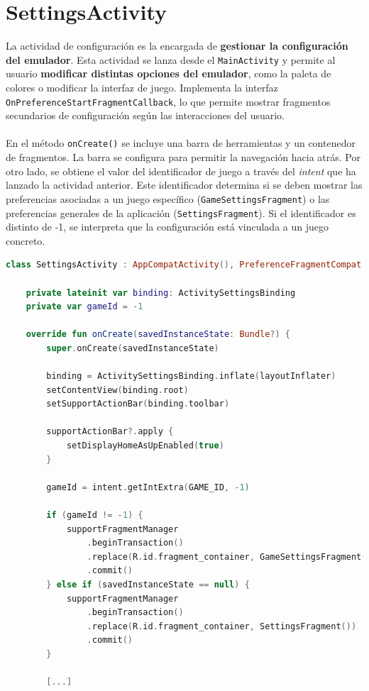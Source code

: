 \section{SettingsActivity}
La actividad de configuración es la encargada de \textbf{gestionar la configuración del emulador}. Esta actividad se lanza desde el \texttt{MainActivity} y permite al usuario \textbf{modificar distintas opciones del emulador}, como la paleta de colores o modificar la interfaz de juego. Implementa la interfaz \texttt{OnPreferenceStartFragmentCallback}, lo que permite mostrar fragmentos secundarios de configuración según las interacciones del usuario.
\\\\
En el método \texttt{onCreate()} se incluye una barra de herramientas y un contenedor de fragmentos. La barra se configura para permitir la navegación hacia atrás. Por otro lado, se obtiene el valor del identificador de juego a través del \textit{intent} que ha lanzado la actividad anterior. Este identificador determina si se deben mostrar las preferencias asociadas a un juego específico (\texttt{GameSettingsFragment}) o las preferencias generales de la aplicación (\texttt{SettingsFragment}). Si el identificador es distinto de -1, se interpreta que la configuración está vinculada a un juego concreto.

\begin{lstlisting}[language=Kotlin, caption={SettingsActivity - Inicialización.}, label={code:settingsActivityInit}]
    class SettingsActivity : AppCompatActivity(), PreferenceFragmentCompat.OnPreferenceStartFragmentCallback {

    private lateinit var binding: ActivitySettingsBinding
    private var gameId = -1

    override fun onCreate(savedInstanceState: Bundle?) {
        super.onCreate(savedInstanceState)

        binding = ActivitySettingsBinding.inflate(layoutInflater)
        setContentView(binding.root)
        setSupportActionBar(binding.toolbar)

        supportActionBar?.apply {
            setDisplayHomeAsUpEnabled(true)
        }

        gameId = intent.getIntExtra(GAME_ID, -1)

        if (gameId != -1) {
            supportFragmentManager
                .beginTransaction()
                .replace(R.id.fragment_container, GameSettingsFragment(gameId))
                .commit()
        } else if (savedInstanceState == null) {
            supportFragmentManager
                .beginTransaction()
                .replace(R.id.fragment_container, SettingsFragment())
                .commit()
        }

        [...]
\end{lstlisting}

